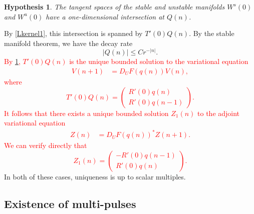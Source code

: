 \documentclass[12pt]{elsarticle}
\newtheorem{hypothesis}{Hypothesis}
\newcommand{\revised}[1]{ \textcolor{red}{#1} }
\begin{document}
\begin{hypothesis}\label{intersectionhyp}
The tangent spaces of the stable and unstable manifolds $W^s(0)$ and $W^u(0)$ have a one-dimensional intersection at $Q(n)$.
\end{hypothesis}

\noindent By \cref{Lkernel1}, this intersection is spanned by $T'(0)Q(n)$. By the stable manifold theorem, we have the decay rate
\begin{equation}\label{Qdecay}
|Q(n)| \leq C r^{-|n|}.
\end{equation}
\revised{
By \cref{intersectionhyp}, $T'(0) Q(n)$ is the unique bounded solution to the variational equation
\begin{align*}
V(n+1) &= D_U F(q(n)) V(n),
\end{align*}
where
\begin{equation}\label{varsol}
T'(0) Q(n) = \begin{pmatrix} R'(0) q(n) \\ R'(0) q(n-1) \end{pmatrix}.
\end{equation}
It follows that there exists a unique bounded solution $Z_1(n)$ to the adjoint variational equation
\begin{align*}
Z(n) &= D_U F(q(n))^* Z(n+1).
\end{align*}
We can verify directly that
\begin{equation}\label{adjvarsol}
Z_1(n) = \begin{pmatrix} -R'(0) q(n-1) \\ R'(0) q(n) \end{pmatrix}.
\end{equation}
}
In both of these cases, uniqueness is up to scalar multiples.

\subsection{Existence of multi-pulses}
\end{document}
